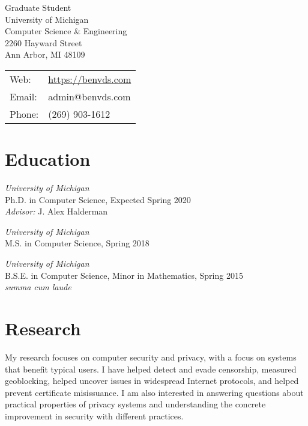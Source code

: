 \documentclass[margin,11pt]{res} %
\begin{document}
\begin{adjustwidth}{-1.3in}{0pt}
\vspace{20pt}

\noindent 
\parbox[m]{4in}{
Graduate Student \\
University of Michigan\\
Computer Science \& Engineering\\
2260 Hayward Street\\
Ann Arbor, MI  48109
}
\begin{tabular}{ll}
{Web}:& \url{https://benvds.com}\\
{Email}:& admin@benvds.com\\
{Phone}:& (269) 903-1612
\end{tabular}
\vspace{10pt}
\end{adjustwidth}

\section{\large Education}

        \emph{University of Michigan}\\
        Ph.D. in Computer Science, Expected Spring 2020\\
        \emph{Advisor:} J. Alex Halderman
		
        \emph{University of Michigan}\\
        M.S. in Computer Science, Spring 2018

        \emph{University of Michigan}\\
        B.S.E. in Computer Science, Minor in Mathematics, Spring 2015\\
		\emph{summa cum laude}


\vspace{6pt}
\section{\large Research}

My research focuses on computer security and privacy, with a focus on systems that benefit typical users. I have helped detect and evade censorship, measured geoblocking, helped uncover issues in widespread Internet protocols, and helped prevent certificate misissuance.
I am also interested in answering questions about practical properties of privacy systems and understanding the concrete improvement in security with different practices.
\end{document}
